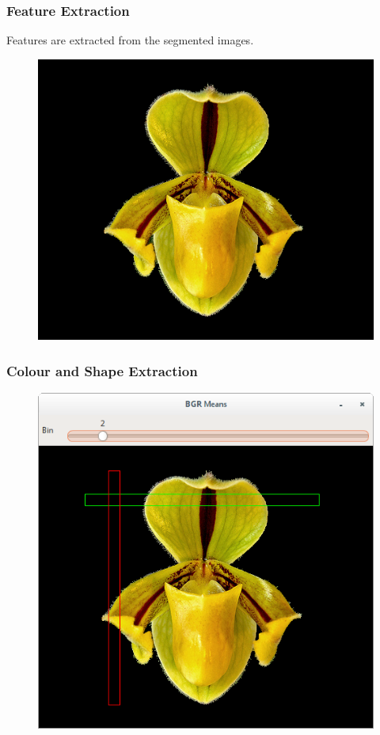 \documentclass[]{beamer}
\begin{document}
    \begin{frame}
        \frametitle{Feature Extraction}

        Features are extracted from the segmented images.

        \begin{figure}[!htb]
              \includegraphics[width=\linewidth]{grabcut_output}
            \endminipage\hfill
        \end{figure}
    \end{frame}

    \begin{frame}[plain]
        \frametitle{Colour and Shape Extraction}
        \begin{figure}[h]
        \centering
        \includegraphics[width=.60\textwidth]{BGR_means_bins}
        \end{figure}
    \end{frame}
\end{document}
